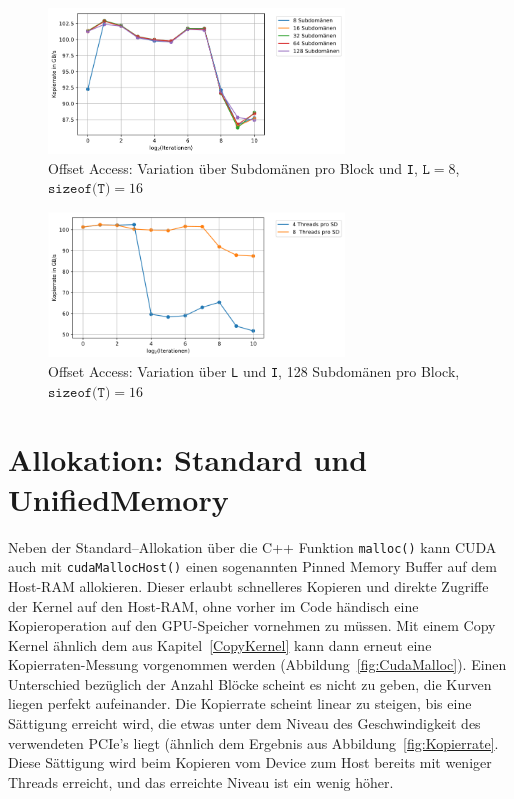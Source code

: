 \documentclass[11pt, abstract=on]{scrartcl}
\begin{document}
\begin{figure} [htbp]
 	\centering
 		\includegraphics[width=0.7\textwidth]{Graph_OffsetAccessSDpBlock3.png}
 	\caption{Offset Access: Variation über Subdomänen pro Block und \texttt{I}, $\texttt{L} = 8$, $\texttt{sizeof(T)} = 16$}
 	\label{fig:OffsetSD2}
\end{figure}

\begin{figure} [htbp]
 	\centering
 		\includegraphics[width=0.7\textwidth]{Graph_OffsetAccessSDpBlock4.png}
 	\caption{Offset Access: Variation über \texttt{L} und \texttt{I}, 128 Subdomänen pro Block, $\texttt{sizeof(T)} = 16$}
 	\label{fig:OffsetSD3}
\end{figure}

\section{Allokation: Standard und UnifiedMemory}
Neben der Standard--Allokation über die C++ Funktion \texttt{malloc()} kann CUDA auch mit \texttt{cudaMallocHost()} einen sogenannten Pinned Memory Buffer auf dem Host-RAM allokieren. Dieser erlaubt schnelleres Kopieren und direkte Zugriffe der Kernel auf den Host-RAM, ohne vorher im Code händisch eine Kopieroperation auf den GPU-Speicher vornehmen zu müssen. Mit einem Copy Kernel ähnlich dem aus Kapitel~\ref{CopyKernel} kann dann erneut eine Kopierraten-Messung vorgenommen werden (Abbildung~\ref{fig:CudaMalloc}). Einen Unterschied bezüglich der Anzahl Blöcke scheint es nicht zu geben, die Kurven liegen perfekt aufeinander. Die Kopierrate scheint linear zu steigen, bis eine Sättigung erreicht wird, die etwas unter dem Niveau des Geschwindigkeit des verwendeten PCIe's liegt (ähnlich dem Ergebnis aus Abbildung~\ref{fig:Kopierrate}. Diese Sättigung wird beim Kopieren vom Device zum Host bereits mit weniger Threads erreicht, und das erreichte Niveau ist ein wenig höher. 
\end{document}
